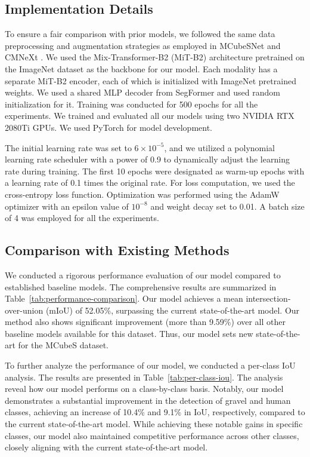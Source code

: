 \documentclass{article}
\begin{document}
\subsection{Implementation Details}

To ensure a fair comparison with prior models, we followed the same data preprocessing and augmentation strategies as employed in MCubeSNet \cite{Liang2022MCubeS} and CMNeXt \cite{zhang2023CMNext}. We used the Mix-Transformer-B2 (MiT-B2) \cite{xie2021segformer} architecture pretrained on the ImageNet \cite{deng2009ImageNet} dataset as the backbone for our model. Each modality has a separate MiT-B2 \cite{xie2021segformer} encoder, each of which is initialized with ImageNet \cite{deng2009ImageNet} pretrained weights. We used a shared MLP decoder from SegFormer \cite{xie2021segformer} and used random initialization for it. Training was conducted for 500 epochs for all the experiments. We trained and evaluated all our models using two NVIDIA RTX 2080Ti GPUs. We used PyTorch for model development. 

The initial learning rate was set to $6\times 10^{-5}$, and we utilized a polynomial learning rate scheduler with a power of 0.9 to dynamically adjust the learning rate during training. The first 10 epochs were designated as warm-up epochs with a learning rate of 0.1 times the original rate. For loss computation, we used the cross-entropy loss function. Optimization was performed using the AdamW \cite{loshchilov2017adamw} optimizer with an epsilon value of $10^{-8}$ and weight decay set to 0.01. A batch size of 4 was employed for all the experiments. 


\subsection{Comparison with Existing Methods}
We conducted a rigorous performance evaluation of our model compared to established baseline models. The comprehensive results are summarized in Table~\ref{tab:performance-comparison}. Our model achieves a mean intersection-over-union (mIoU) of 52.05\%, surpassing the current state-of-the-art model. Our method also shows significant improvement (more than 9.59\%) over all other baseline models available for this dataset. Thus, our model sets new state-of-the-art for the MCubeS dataset.

To further analyze the performance of our model, we conducted a per-class IoU analysis. The results are presented in Table~\ref{tab:per-class-iou}. The analysis reveal how our model performs on a class-by-class basis. Notably, our model demonstrates a substantial improvement in the detection of gravel and human classes, achieving an increase of 10.4\% and 9.1\% in IoU, respectively, compared to the current state-of-the-art model. While achieving these notable gains in specific classes, our model also maintained competitive performance across other classes, closely aligning with the current state-of-the-art model. 
\end{document}
